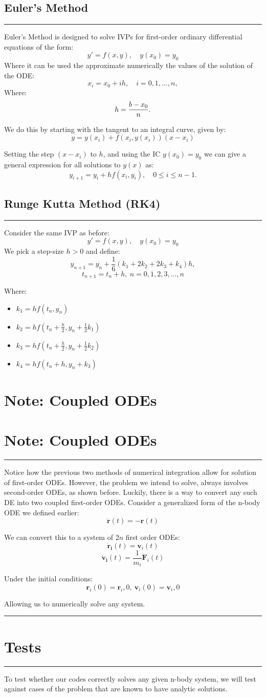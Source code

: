 \documentclass[hidelinks, 11pt, dvipsnames]{article}
\newcommand{\psection}[1]{{
    \begin{center}
        \noindent \rule{17cm}{0.4pt}
            \section*{\LARGE #1}
        \noindent \rule{17cm}{0.4pt}
    \end{center}
}}
\newcommand{\psubsection}[1]{{
    \begin{center}
            \section*{\Large #1}
        \noindent \rule{17cm}{0.2pt}
    \end{center}
}}
\newcommand{\psubsubsection}[1]{{\section*{#1}
    \section*{\large #1}
    \noindent \rule{17cm}{0.05pt}
}}
\begin{document}
\psubsection{Euler's Method}
Euler's Method is designed to solve IVPs for first-order ordinary differential equations of the form:
$$ \label{eq:3.1.1} y'=f(x,y),\quad y(x_0)=y_0 $$
Where it can be used the approximate numerically the values of the solution of the ODE: 
$$ x_i=x_0+ih,\quad i=0,1, \dots,n, \nonumber $$
Where:
$$ h={b-x_0\over n}.\nonumber $$

We do this by starting with the tangent to an integral curve, given by:
$$ \label{eq:3.1.2} y=y(x_i)+f(x_i,y(x_i))(x-x_i) $$

Setting the step $(x-x_i)$ to $h$, and using the IC $y(x_0) = y_0$ we can give a general expression for all solutions to $y(x)$ as:
$$ \label{eq:3.1.4} y_{i+1}=y_i+hf(x_i,y_i),\quad 0\le i\le n-1. $$


\psubsection{Runge Kutta Method (RK4)}
Consider the same IVP as before:
$$ \label{eq:3.1.1} y'=f(x,y),\quad y(x_0)=y_0 $$
We pick a step-size $h>0$ and define:
$$ y_{n+1} = y_n + \frac{1}{6}(k_1 + 2k_2 + 2k_3 + k_4)h, $$
$$ t_{n+1} = t_n + h, \ n= 0,1,2,3,...,n $$

Where:
\begin{itemize}
    \item $k_{1}=h f\left(t_{n}, y_{n}\right)$
    \item $k_{2}=h f\left(t_{n}+\frac{h}{2}, y_{n}+\frac{1}{2} k_{1}\right)$
    \item $k_{3}=h f\left(t_{n}+\frac{h}{2}, y_{n}+\frac{1}{2} k_{2}\right)$
    \item $k_{4}=h f\left(t_{n}+h, y_{n}+k_{3}\right)$
\end{itemize}

\psubsubsection{Note: Coupled ODEs}
Notice how the previous two methods of numerical integration allow for solution of first-order ODEs. However, the problem we intend to solve, always involves second-order ODEs, as shown before. Luckily, there is a way to convert any such DE into two coupled first-order ODEs. Consider a generalized form of the n-body ODE we defined earlier:
$$  \mathbf{\ddot{r}}(t) = -\mathbf{r}(t) $$

We can convert this to a system of $2n$ first order ODEs:
$$  \mathbf{\dot{r}_i}(t) = \mathbf{v}_i(t)$$
$$\mathbf{\dot{v}_i}(t) = \frac{1}{m_i}\mathbf{F}_i(t)$$

Under the initial conditions:
$$ \mathbf{r}_i(0) = \mathbf{r}_i,0, \ \mathbf{v}_i(0) = \mathbf{v}_i,0 $$

Allowing us to numerically solve any system.

\psection{Tests}
To test whether our codes correctly solves any given n-body system, we will test against cases of the problem that are known to have analytic solutions.
\end{document}
